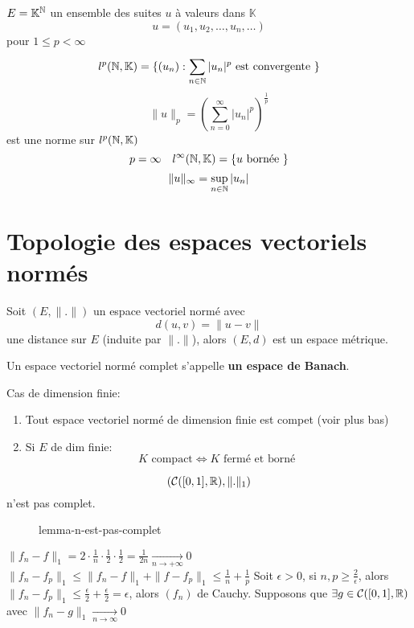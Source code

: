 \begin{eg}
    $E = \mathbb{K}^{\mathbb{N}}$ un ensemble des suites $u$ à valeurs dans  $\mathbb{K}$ 
    \[
    u = (u_1, u_2, \ldots, u_n, \ldots )
    \] 
    pour $1 \le p < \infty$
    \[
        l^{p}(\mathbb{N}, \mathbb{K}) = \{(u_n): \sum_{n \in \mathbb{N}}^{} |u_n|^{p} \text{ est convergente } \}
    \] 
    \[
        \|u\|_p = \left( \sum_{n=0}^{\infty} |u_n|^{p} \right)^{\frac{1}{p}}
    \] 
    est une norme sur $l^{p}(\mathbb{N}, \mathbb{K})$
    \[
        p = \infty \quad l^{\infty}(\mathbb{N}, \mathbb{K}) = \{u \text{ bornée } \}
    \] 
    \[
        \|u\|_{\infty} = \sup_{n \in \mathbb{N}} |u_n|
    \] 
\end{eg}
\section{Topologie des espaces vectoriels normés}
\begin{prop}
    Soit $(E, \| . \|)$ un espace vectoriel normé avec 
     \[
    d(u, v) = \|u - v\|
    \] 
    une distance sur $E$ (induite par $\| . \|$), alors  $(E, d)$ est un espace métrique.
\end{prop}
\begin{definition}
    Un espace vectoriel normé complet s'appelle \textbf{un espace de Banach}.
\end{definition}
Cas de dimension finie:
\begin{enumerate}
    \item Tout espace vectoriel normé de dimension finie est compet (voir plus bas)
    \item Si $E$ de dim finie:
         \[
        K \text{ compact} \iff K \text{ fermé et borné }
        \] 
\end{enumerate}
\begin{lemma}
   \[
       \left( \mathcal{C}([0, 1], \mathbb{R}), \|.\|_1 \right) 
   \]  
   n'est pas complet.
\end{lemma}
\begin{figure}[H]
    \centering
    \caption{lemma-n-est-pas-complet}
    \label{fig:lemma-n-est-pas-complet}
\end{figure}
$\|f_n - f\|_1 = 2 \cdot \frac{1}{n} \cdot \frac{1}{2} \cdot \frac{1}{2} = \frac{1}{2n} \xrightarrow[n \to +\infty]{} 0$ 
$\|f_n - f_p\|_1 \le \|f_n - f\|_1 + \|f - f_p\|_1 \le  \frac{1}{n} + \frac{1}{p}$
Soit $\epsilon > 0$, si  $n, p \ge \frac{2}{\epsilon}$, alors $\|f_n - f_p\|_1 \le  \frac{\epsilon}{2} + \frac{\epsilon}{2} = \epsilon$, alors $(f_n)$ de Cauchy. Supposons que  $\exists g \in \mathcal{C}([0,1], \mathbb{R})$ avec $\|f_n - g\|_1 \xrightarrow[n \to  \infty]{} 0$
